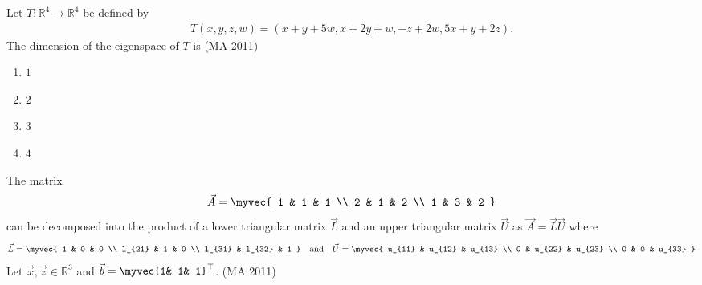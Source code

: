 \item Let $T:\mathbb{R}^4 \to \mathbb{R}^4$ be defined by
\begin{align*}
 T(x, y, z, w) = (x + y + 5w, x + 2y + w, -z + 2w, 5x + y + 2z).   
\end{align*}
The dimension of the eigenspace of $T$ is  
\hfill{(MA 2011)}
\begin{multicols}{4}
\begin{enumerate}
\item  $1$ \hspace{2cm}
\item  $2$ \hspace{2cm}
\item  $3$ \hspace{2cm}
\item  $4$
\end{enumerate}
\end{multicols}
\item 
The matrix 
\begin{align*}
\vec{A} = \myvec{
1 & 1 & 1 \\
2 & 1 & 2 \\
1 & 3 & 2
}
\end{align*}
can be decomposed into the product of a lower triangular matrix $\vec{L}$ and an upper triangular matrix $\vec{U}$ as $\vec{A} = \vec{L}\vec{U}$ where
\begin{align*}
\vec{L} = \myvec{
1 & 0 & 0 \\
l_{21} & 1 & 0 \\
l_{31} & l_{32} & 1
}
\quad \text{and} \quad
\vec{U} = \myvec{
u_{11} & u_{12} & u_{13} \\
0 & u_{22} & u_{23} \\
0 & 0 & u_{33}
}
\end{align*}
Let $\vec{x}, \vec{z} \in \mathbb{R}^3$ and $\vec{b} = \myvec{1& 1& 1}^{\top}$.
\hfill{(MA 2011)}

